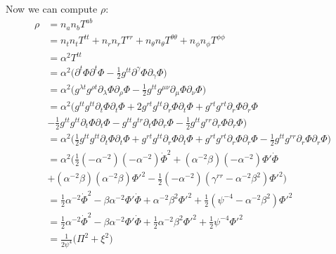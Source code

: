 \documentclass[12pt]{article}
\numberwithin{equation}{section}
\begin{document}
Now we can compute $\rho$:
\begin{equation} \label{eq:rho}
\begin{aligned}
\rho &= n_a n_b T^{ab} \\
&= n_t n_t T^{tt} + n_r n_r T^{rr} + n_\theta n_\theta T^{\theta \theta} + n_\phi n_\phi T^{\phi \phi} \\
&= \alpha^{2} T^{tt} \\
&= \alpha^{2} \Big( \partial^t \Phi \partial^t \Phi - \frac{1}{2} g^{t t} \partial^\gamma \Phi \partial_\gamma \Phi \Big) \\
&= \alpha^{2} \Big( g^{\lambda t} g^{\rho t} \partial_\lambda \Phi \partial_\rho \Phi - \frac{1}{2} g^{t t} g^{\mu \nu} \partial_{\mu} \Phi \partial_{\nu} \Phi \Big) \\
&= \alpha^{2} \Big( g^{t t} g^{t t} \partial_t \Phi \partial_t \Phi + 2 g^{r t} g^{t t} \partial_r \Phi \partial_t \Phi + g^{r t} g^{r t} \partial_r \Phi \partial_r \Phi \\
&- \frac{1}{2} g^{t t} g^{t t} \partial_{t} \Phi \partial_{t} \Phi - g^{t t} g^{t r} \partial_{t} \Phi \partial_{r} \Phi - \frac{1}{2} g^{t t} g^{r r} \partial_{r} \Phi \partial_{r} \Phi \Big) \\
&= \alpha^{2} \Big( \frac{1}{2} g^{t t} g^{t t} \partial_t \Phi \partial_t \Phi + g^{r t} g^{t t} \partial_r \Phi \partial_t \Phi + g^{r t} g^{r t} \partial_r \Phi \partial_r \Phi - \frac{1}{2} g^{t t} g^{r r} \partial_{r} \Phi \partial_{r} \Phi \Big) \\
&= \alpha^{2} \Big( \frac{1}{2} (-\alpha^{-2}) (-\alpha^{-2}) \dot{\Phi}^2 + (\alpha^{-2} \beta) (-\alpha^{-2}) \Phi' \dot{\Phi} \\
&+ (\alpha^{-2} \beta) (\alpha^{-2} \beta) \Phi'^2 - \frac{1}{2} (-\alpha^{-2}) (\gamma^{rr} - \alpha^{-2} \beta^2) \Phi'^2 \Big) \\
&= \frac{1}{2} \alpha^{-2} \dot{\Phi}^2 - \beta \alpha^{-2} \Phi' \dot{\Phi} + \alpha^{-2} \beta^2 \Phi'^2 + \frac{1}{2} (\psi^{-4} - \alpha^{-2} \beta^2) \Phi'^2 \\
&= \frac{1}{2} \alpha^{-2} \dot{\Phi}^2 - \beta \alpha^{-2} \Phi' \dot{\Phi} + \frac{1}{2} \alpha^{-2} \beta^2 \Phi'^2 + \frac{1}{2} \psi^{-4} \Phi'^2 \\
&= \frac{1}{2 \psi^{4}} \Big( \Pi^2 + \xi^2 \Big) \\
\end{aligned}
\end{equation}
\end{document}
